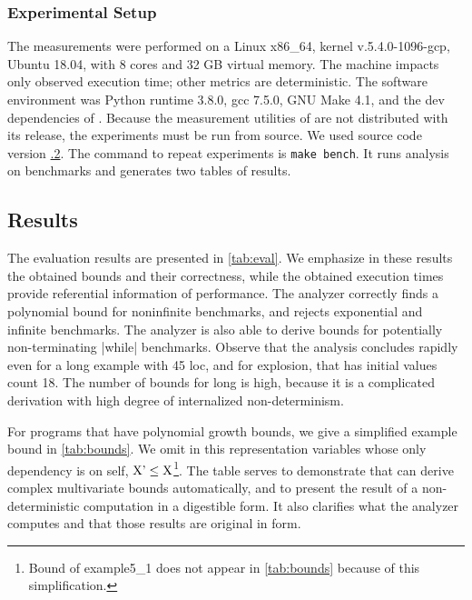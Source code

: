 \documentclass[runningheads]{llncs}
\begin{document}
\subsubsection{Experimental Setup}

The measurements were performed on a Linux x86\_64, kernel v.5.4.0-1096-gcp, Ubuntu 18.04, with 8 cores and 32 GB virtual memory.
The machine impacts only observed execution time; other metrics are deterministic.
The software environment was Python runtime 3.8.0, gcc 7.5.0, GNU Make 4.1, and the dev dependencies of \pymwp.
Because the measurement utilities of \pymwp{ }are not distributed with its release, the experiments must be run from source.
We used source code version \href{https://github.com/statycc/pymwp/releases/tag/0.4.2}{.2}.
The command to repeat experiments is \texttt{make bench}.
It runs analysis on benchmarks and generates two tables of results.


\subsection{Results}\label{subsec:results}



The evaluation results are presented in \autoref{tab:eval}.
We emphasize in these results the obtained bounds and their correctness, while the obtained execution times provide referential information of performance.
The analyzer correctly finds a polynomial bound for {noninfinite} benchmarks, and rejects {exponential} and {infinite} benchmarks.
The analyzer is also able to derive bounds for potentially non-terminating \pr|while| benchmarks.
Observe that the analysis concludes rapidly even for a long example with 45 loc, and for explosion, that has initial values count 18.
The number of bounds for long is high, because it is a complicated derivation with high degree of internalized non-determinism.

For programs that have polynomial growth bounds, we give a simplified example bound in \autoref{tab:bounds}.
We omit in this representation variables whose only dependency is on self, \eg $\text{\prc|X|'} \leq \text{\prc|X|}$\footnote{
Bound of example5\_1 does not appear in \autoref{tab:bounds} because of this simplification.}.
The table serves to demonstrate that \pymwp can derive complex multivariate bounds automatically,
and to present the result of a non-deterministic computation in a digestible form.
It also clarifies what the analyzer computes and that those results are original in form.
\end{document}

